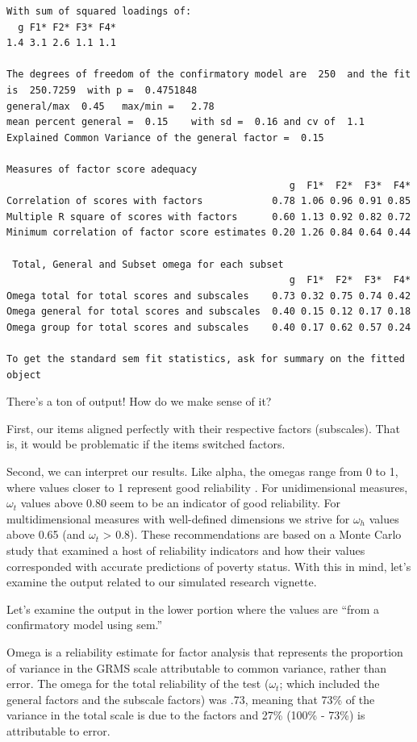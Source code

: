 \documentclass[
  english,
]{book}
\begin{document}
\begin{verbatim}
With sum of squared loadings of:
  g F1* F2* F3* F4* 
1.4 3.1 2.6 1.1 1.1 

The degrees of freedom of the confirmatory model are  250  and the fit is  250.7259  with p =  0.4751848
general/max  0.45   max/min =   2.78
mean percent general =  0.15    with sd =  0.16 and cv of  1.1 
Explained Common Variance of the general factor =  0.15 

Measures of factor score adequacy             
                                                 g  F1*  F2*  F3*  F4*
Correlation of scores with factors            0.78 1.06 0.96 0.91 0.85
Multiple R square of scores with factors      0.60 1.13 0.92 0.82 0.72
Minimum correlation of factor score estimates 0.20 1.26 0.84 0.64 0.44

 Total, General and Subset omega for each subset
                                                 g  F1*  F2*  F3*  F4*
Omega total for total scores and subscales    0.73 0.32 0.75 0.74 0.42
Omega general for total scores and subscales  0.40 0.15 0.12 0.17 0.18
Omega group for total scores and subscales    0.40 0.17 0.62 0.57 0.24

To get the standard sem fit statistics, ask for summary on the fitted object
\end{verbatim}

There's a ton of output! How do we make sense of it?

First, our items aligned perfectly with their respective factors (subscales). That is, it would be problematic if the items switched factors.

Second, we can interpret our results. Like alpha, the omegas range from 0 to 1, where values closer to 1 represent good reliability \citep{najera_catalan_reliability_2019}. For unidimensional measures, \(\omega_{t}\) values above 0.80 seem to be an indicator of good reliability. For multidimensional measures with well-defined dimensions we strive for \(\omega_{h}\) values above 0.65 (and \(\omega_{t}\) \textgreater{} 0.8). These recommendations are based on a Monte Carlo study that examined a host of reliability indicators and how their values corresponded with accurate predictions of poverty status. With this in mind, let's examine the output related to our simulated research vignette.

Let's examine the output in the lower portion where the values are ``from a confirmatory model using sem.''

Omega is a reliability estimate for factor analysis that represents the proportion of variance in the GRMS scale attributable to common variance, rather than error. The omega for the total reliability of the test (\(\omega_{t}\); which included the general factors and the subscale factors) was .73, meaning that 73\% of the variance in the total scale is due to the factors and 27\% (100\% - 73\%) is attributable to error.
\end{document}
